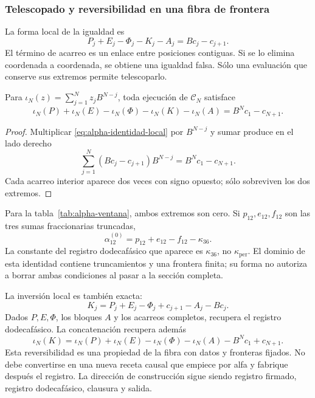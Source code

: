 \subsubsection{Telescopado y reversibilidad en una fibra de frontera}
\label{subsec:alpha-telescopia}

La forma local de la igualdad es
\begin{equation}
 P_j+E_j-\Phi_j-K_j-A_j=Bc_j-c_{j+1}.
 \label{eq:alpha-identidad-local}
\end{equation}
El término de acarreo es un enlace entre posiciones contiguas. Si se lo
elimina coordenada a coordenada, se obtiene una igualdad falsa. Sólo una
evaluación que conserve sus extremos permite telescoparlo.

\begin{proposition}
\label{prop:alpha-telescopia}
Para \(\iota_N(z)=\sum_{j=1}^{N}z_jB^{N-j}\), toda ejecución de
\(\mathcal C_N\) satisface
\begin{equation}
 \iota_N(P)+\iota_N(E)-\iota_N(\Phi)-\iota_N(K)-\iota_N(A)
 =B^Nc_1-c_{N+1}.
 \label{eq:alpha-telescopia}
\end{equation}
\end{proposition}

\begin{proof}
Multiplicar \eqref{eq:alpha-identidad-local} por \(B^{N-j}\) y sumar
produce en el lado derecho
\[
 \sum_{j=1}^{N}(Bc_j-c_{j+1})B^{N-j}=B^Nc_1-c_{N+1}.
\]
Cada acarreo interior aparece dos veces con signo opuesto; sólo sobreviven
los dos extremos.
\end{proof}

Para la tabla~\ref{tab:alpha-ventana}, ambos extremos son cero. Si
\(p_{12},e_{12},f_{12}\) son las tres sumas fraccionarias truncadas,
\[
 \alpha_{12}^{(0)}=p_{12}+e_{12}-f_{12}-\kappa_{36}.
\]
La constante del registro dodecafásico que aparece es \(\kappa_{36}\), no
\(\kappa_{\mathrm{per}}\). El dominio de esta identidad contiene
truncamientos y una frontera finita; su forma no autoriza a borrar ambas
condiciones al pasar a la sección completa.

La inversión local es también exacta:
\[
 K_j=P_j+E_j-\Phi_j+c_{j+1}-A_j-Bc_j.
\]
Dados \(P,E,\Phi\), los bloques \(A\) y los acarreos completos,
recupera el registro dodecafásico. La concatenación recupera además
\[
 \iota_N(K)=\iota_N(P)+\iota_N(E)-\iota_N(\Phi)-\iota_N(A)
             -B^Nc_1+c_{N+1}.
\]
Esta reversibilidad es una propiedad de la fibra con datos y fronteras
fijados. No debe convertirse en una nueva receta causal que empiece por
alfa y fabrique después el registro. La dirección de construcción sigue
siendo registro firmado, registro dodecafásico, clausura y salida.

